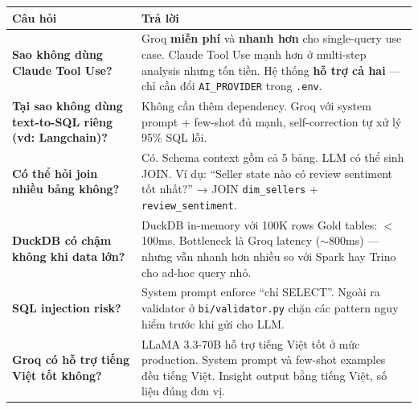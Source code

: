 \documentclass[12pt, a4paper]{article}
\begin{document}
\begin{tcolorbox}[colback=blue!5, colframe=blue!40, arc=6pt,
  title={\faQuestion\ Câu hỏi thường gặp — Agentic BI}]

\renewcommand{\arraystretch}{1.6}
\begin{tabularx}{\textwidth}{>{\bfseries}p{5cm} X}
\toprule
Câu hỏi & Trả lời \\
\midrule
Sao không dùng Claude Tool Use? &
  Groq \textbf{miễn phí} và \textbf{nhanh hơn} cho single-query use case.
  Claude Tool Use mạnh hơn ở multi-step analysis nhưng tốn tiền.
  Hệ thống \textbf{hỗ trợ cả hai} --- chỉ cần đổi \texttt{AI\_PROVIDER} trong \texttt{.env}. \\

Tại sao không dùng text-to-SQL riêng (vd: Langchain)? &
  Không cần thêm dependency. Groq với system prompt + few-shot đủ mạnh,
  self-correction tự xử lý 95\% SQL lỗi. \\

Có thể hỏi join nhiều bảng không? &
  Có. Schema context gồm cả 5 bảng. LLM có thể sinh JOIN.
  Ví dụ: ``Seller state nào có review sentiment tốt nhất?''
  → JOIN \texttt{dim\_sellers} + \texttt{review\_sentiment}. \\

DuckDB có chậm không khi data lớn? &
  DuckDB in-memory với 100K rows Gold tables: $<$100ms.
  Bottleneck là Groq latency ($\sim$800ms) --- nhưng vẫn nhanh hơn nhiều so với
  Spark hay Trino cho ad-hoc query nhỏ. \\

SQL injection risk? &
  System prompt enforce ``chỉ SELECT''.
  Ngoài ra validator ở \texttt{bi/validator.py} chặn các pattern
  nguy hiểm trước khi gửi cho LLM. \\

Groq có hỗ trợ tiếng Việt tốt không? &
  LLaMA 3.3-70B hỗ trợ tiếng Việt tốt ở mức production.
  System prompt và few-shot examples đều tiếng Việt.
  Insight output bằng tiếng Việt, số liệu đúng đơn vị. \\
\bottomrule
\end{tabularx}

\end{tcolorbox}

\end{document}
